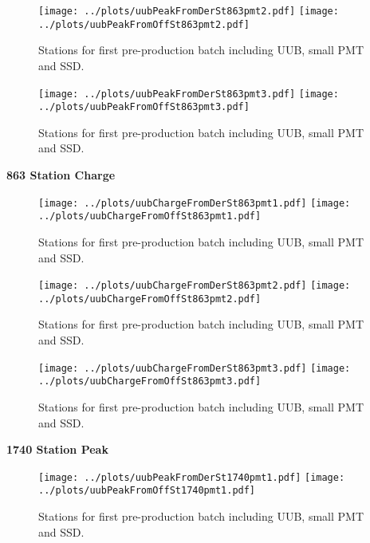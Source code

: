 \documentclass[twoside, final, 10pt]{articleMine}
\begin{document}
\begin{figure}[!tbh]
  \centering
  \subfigure
  {
    \texttt{[image: ../plots/uubPeakFromDerSt863pmt2.pdf]}
    \texttt{[image: ../plots/uubPeakFromOffSt863pmt2.pdf]}
  }
  \caption{Stations for first pre-production batch including UUB, small PMT and SSD.}
  \label{figChLowHigh}
\end{figure}

\begin{figure}[!tbh]
  \centering
  \subfigure
  {
    \texttt{[image: ../plots/uubPeakFromDerSt863pmt3.pdf]}
    \texttt{[image: ../plots/uubPeakFromOffSt863pmt3.pdf]}
  }
  \caption{Stations for first pre-production batch including UUB, small PMT and SSD.}
  \label{figChLowHigh}
\end{figure}
\clearpage

{\bf 863 Station Charge}

\begin{figure}[!tbh]
  \centering
  \subfigure
  {
    \texttt{[image: ../plots/uubChargeFromDerSt863pmt1.pdf]}
    \texttt{[image: ../plots/uubChargeFromOffSt863pmt1.pdf]}
  }
  \caption{Stations for first pre-production batch including UUB, small PMT and SSD.}
  \label{figChLowHigh}
\end{figure}

\begin{figure}[!tbh]
  \centering
  \subfigure
  {
    \texttt{[image: ../plots/uubChargeFromDerSt863pmt2.pdf]}
    \texttt{[image: ../plots/uubChargeFromOffSt863pmt2.pdf]}
  }
  \caption{Stations for first pre-production batch including UUB, small PMT and SSD.}
  \label{figChLowHigh}
\end{figure}

\begin{figure}[!tbh]
  \centering
  \subfigure
  {
    \texttt{[image: ../plots/uubChargeFromDerSt863pmt3.pdf]}
    \texttt{[image: ../plots/uubChargeFromOffSt863pmt3.pdf]}
  }
  \caption{Stations for first pre-production batch including UUB, small PMT and SSD.}
  \label{figChLowHigh}
\end{figure}
\clearpage

{\bf 1740 Station Peak}
\begin{figure}[!tbh]
  \centering
  \subfigure
  {
    \texttt{[image: ../plots/uubPeakFromDerSt1740pmt1.pdf]}
    \texttt{[image: ../plots/uubPeakFromOffSt1740pmt1.pdf]}
  }
  \caption{Stations for first pre-production batch including UUB,
  small PMT and SSD.}
  \label{figChLowHigh}
\end{figure}
\end{document}
